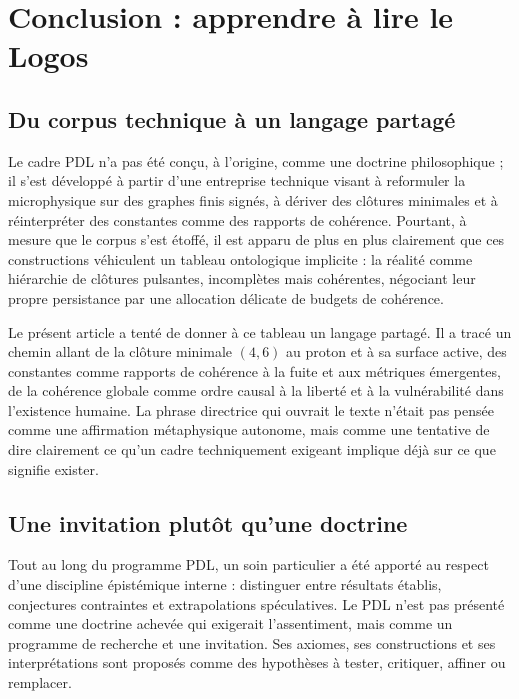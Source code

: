 \documentclass[11pt,a4paper]{article}
\theoremstyle{definition}
\begin{document}
\section{Conclusion : apprendre à lire le Logos}
\label{sec:conclusion}

\subsection{Du corpus technique à un langage partagé}

Le cadre PDL n’a pas été conçu, à l’origine, comme une doctrine philosophique ; il s’est développé à partir d’une entreprise technique visant à reformuler la microphysique sur des graphes finis signés, à dériver des clôtures minimales et à réinterpréter des constantes comme des rapports de cohérence.\cite{Laubscher_EmergencePhysicalReality_2024,Laubscher_MinimalClosures_46_2024,Laubscher_Alpha_v2_2024,Laubscher_UniversalCoherenceLeakage_2024} Pourtant, à mesure que le corpus s’est étoffé, il est apparu de plus en plus clairement que ces constructions véhiculent un tableau ontologique implicite : la réalité comme hiérarchie de clôtures pulsantes, incomplètes mais cohérentes, négociant leur propre persistance par une allocation délicate de budgets de cohérence.

Le présent article a tenté de donner à ce tableau un langage partagé. Il a tracé un chemin allant de la clôture minimale \((4,6)\) au proton et à sa surface active, des constantes comme rapports de cohérence à la fuite et aux métriques émergentes, de la cohérence globale comme ordre causal à la liberté et à la vulnérabilité dans l’existence humaine.\cite{Laubscher_ProtonArch_v2_2024,Laubscher_EffectiveFields_2024,Laubscher_CavityModes_PDL_2024,Laubscher_Existence_PulsatingClosure_2026} La phrase directrice qui ouvrait le texte n’était pas pensée comme une affirmation métaphysique autonome, mais comme une tentative de dire clairement ce qu’un cadre techniquement exigeant implique déjà sur ce que signifie exister.

\subsection{Une invitation plutôt qu'une doctrine}

Tout au long du programme PDL, un soin particulier a été apporté au respect d’une discipline épistémique interne : distinguer entre résultats établis, conjectures contraintes et extrapolations spéculatives.\cite{Laubscher_PDL_Position_2024,Laubscher_PDL_GlobalMapping_v6_2024} Le PDL n’est pas présenté comme une doctrine achevée qui exigerait l’assentiment, mais comme un programme de recherche et une invitation. Ses axiomes, ses constructions et ses interprétations sont proposés comme des hypothèses à tester, critiquer, affiner ou remplacer.
\end{document}
